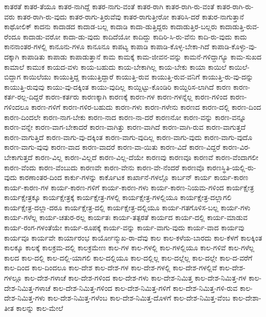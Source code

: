 {ಕಾತರತೆ
ಕಾತರ-ತೆಯೂ
ಕಾತರ-ನಾಗಿದ್ದೆ
ಕಾತರ-ನಾಗು-ವಂತೆ
ಕಾತರ-ರಾಗಿ
ಕಾತರ-ರಾಗಿ-ರು-ವಂತೆ
ಕಾತರ-ರಾಗಿ-ರು-ವರು
ಕಾತರ-ರಾಗಿ-ರು-ವುದು
ಕಾತರ-ರಾಗು-ತ್ತಿರುವೆವು
ಕಾತರ-ರಾಗುತ್ತೀರೋ
ಕಾತರಿಸಿ-ದರೆ
ಕಾತುರ-ನಾಗುತ್ತಾನೆ
ಕಾಥೋಲಿಕ್
ಕಾದನು
ಕಾದಾಡದ
ಕಾದಾಡ-ಬಲ್ಲ
ಕಾದಾಡಿ
ಕಾದಾ-ಡುತ್ತಿದ್ದರು
ಕಾದಾಡುತ್ತಿರ-ಬಲ್ಲರು
ಕಾದಾಡುತ್ತಿ-ರುವ-ರೆಂದೂ
ಕಾದಾಡು-ವರೋ
ಕಾದಾ-ಡು-ವುದು
ಕಾದಿದೆಯೋ
ಕಾದಿದ್ದು
ಕಾದಿರಿ-ಸಿ-ರು-ವೆನು
ಕಾದಿ-ರು-ವುದು
ಕಾದು
ಕಾನನಾಂತರ-ಗಳಲ್ಲಿ
ಕಾನೂನು-ಗಳೂ
ಕಾನೂನೂ
ಕಾಪಟ್ಯ
ಕಾಪಾಡಿ
ಕಾಪಾಡಿ-ಕೊಳ್ಳ-ಬೇಕಾ-ಗಿದೆ
ಕಾಪಾಡಿ-ಕೊಳ್ಳು-ವು-ದಕ್ಕಾಗಿ
ಕಾಪಾಡಿತು
ಕಾಪಾಡು
ಕಾಪಾಡುತ್ತಾನೆ
ಕಾಮ
ಕಾಮಕ್ಕೆ
ಕಾಮ-ಜೀವನ-ವನ್ನು
ಕಾಮನೆ-ಗಳಿದ್ದಾಗ್ಯೂ
ಕಾಮ-ಸುಖದ
ಕಾಮಾಲೆ
ಕಾಮುಕ
ಕಾಯದ-ವಳು
ಕಾಯ-ಬಹುದು
ಕಾಯ-ಬೇಕಾಗಿಲ್ಲ
ಕಾಯ-ಬೇಕು
ಕಾಯಾ
ಕಾಯಿಲೆ
ಕಾಯಿಲೆ-ಬಿದ್ದಾಗ
ಕಾಯಿಲೆಯು
ಕಾಯುತ್ತಿದ್ದ
ಕಾಯುತ್ತಿದ್ದಾರೆ
ಕಾಯುತ್ತಿ-ರುವ
ಕಾಯುತ್ತಿ-ರುವ-ವನಿಗೆ
ಕಾಯುತ್ತಿ-ರು-ವು-ದನ್ನು
ಕಾಯುತ್ತಿ-ರುವುವು
ಕಾಯು-ವು-ದಕ್ಕಿಂತ
ಕಾಯು-ವುದಿಲ್ಲ
ಕಾಯ್ದಿಟ್ಟು-ಕೊಂಡಿರಿ
ಕಾಯ್ದಿರಿಸ-ಲಾಗಿದೆ
ಕಾರಣ
ಕಾರಣ-ಕರ್ತ-ರಲ್ಲ-ದಿದ್ದರೆ
ಕಾರಣ-ಕರ್ತರು
ಕಾರಣಕ್ಕಾಗಿ
ಕಾರಣಕ್ಕೆ
ಕಾರಣ-ಗಳ
ಕಾರಣ-ಗಳನ್ನೆಲ್ಲ
ಕಾರಣ-ಗಳಿಂದ
ಕಾರಣ-ಗಳಿಂದಲೂ
ಕಾರಣ-ಗಳಿಗೆ
ಕಾರಣ-ಗಳಿರ-ಬಹುದು
ಕಾರಣ-ಗಳು
ಕಾರಣ-ಗಳೇನು
ಕಾರಣದ
ಕಾರಣ-ದಲ್ಲಿ
ಕಾರಣ-ದಿಂದ
ಕಾರಣ-ದಿಂದಲೇ
ಕಾರಣ-ನಾಗ-ಬೇಕು
ಕಾರಣ-ನಾದ
ಕಾರಣ-ನಾ-ದರೆ
ಕಾರಣನೋ
ಕಾರಣ-ವನ್ನು
ಕಾರಣ-ವನ್ನೂ
ಕಾರಣ-ವನ್ನೇ
ಕಾರಣ-ವಾಗ-ಬೇಕಾದರೆ
ಕಾರಣ-ವಾಗಿತ್ತು
ಕಾರಣ-ವಾಗಿದೆ
ಕಾರಣ-ವಾಗಿ-ರುವ
ಕಾರಣ-ವಾಗುತ್ತದೆ
ಕಾರಣ-ವಾಗುತ್ತಿದೆ
ಕಾರಣ-ವಾಗು-ವು-ದಕ್ಕಿಂತ
ಕಾರಣ-ವಾಗು-ವುದಿಲ್ಲ
ಕಾರಣ-ವಾಗು-ವುದು
ಕಾರಣ-ವಾಗು-ವುದೊ
ಕಾರಣ-ವಾಗು-ವುವು
ಕಾರಣ-ವಾದ
ಕಾರಣ-ವಾದರೆ
ಕಾರಣ-ವಾ-ಯಿತು
ಕಾರಣ-ವಿದೆ
ಕಾರಣ-ವಿದ್ದರೆ
ಕಾರಣ-ವಿರ-ಬೇಕಾಗುತ್ತದೆ
ಕಾರಣ-ವಿಲ್ಲ
ಕಾರಣ-ವಿಲ್ಲದೆ
ಕಾರಣ-ವಿಲ್ಲ-ದೆಯೇ
ಕಾರಣವು
ಕಾರಣವೂ
ಕಾರಣವೆ
ಕಾರಣ-ವೆಂದಾಗಲೀ
ಕಾರಣ-ವೆಂದು
ಕಾರಣ-ವೆಂಬುದು
ಕಾರಣವೇ
ಕಾರಣ-ವೇನು
ಕಾರಣ-ವೇ-ನೆಂದರೆ
ಕಾರಣವೊ
ಕಾರಣಸ್ಥಿತಿ-ಯಲ್ಲಿ-ರು-ವುದು
ಕಾರಣಾಂತರ-ದಿಂದ
ಕಾರ್ಕು-ಗಳನ್ನು
ಕಾರ್ಕೊಟಕ
ಕಾರ್ಖಾನೆ-ಗಳಲ್ಲೊ
ಕಾರ್ಬನ್
ಕಾರ್ಯ
ಕಾರ್ಯ-ಕಾರಣ
ಕಾರ್ಯ-ಕಾರಣ-ಗಳ
ಕಾರ್ಯ-ಕಾರಣ-ಗಳಿಗೆ
ಕಾರ್ಯ-ಕಾರಣ-ಗಳು
ಕಾರ್ಯ-ಕಾರಣ-ನಿಯಮ-ಗಳಿಂದ
ಕಾರ್ಯಕ್ಷೇತ್ರ
ಕಾರ್ಯಕ್ಷೇತ್ರಕ್ಕೂ
ಕಾರ್ಯಕ್ಷೇತ್ರಕ್ಕೆ
ಕಾರ್ಯಕ್ಷೇತ್ರ-ಗಳಲ್ಲಿ
ಕಾರ್ಯಕ್ಷೇತ್ರ-ಗಳಲ್ಲಿಯೂ
ಕಾರ್ಯಕ್ಷೇತ್ರ-ದಲ್ಲಾಗಲಿ
ಕಾರ್ಯಕ್ಷೇತ್ರ-ದಲ್ಲಾ-ದರೂ
ಕಾರ್ಯಕ್ಷೇತ್ರ-ದಲ್ಲಿ
ಕಾರ್ಯಕ್ಷೇತ್ರ-ದಲ್ಲಿಯೂ
ಕಾರ್ಯ-ಗತಗೊಳಿಸ-ಬಲ್ಲ
ಕಾರ್ಯ-ಗಳು
ಕಾರ್ಯ-ಗಳೆಲ್ಲ
ಕಾರ್ಯ-ಚತುರ-ರಲ್ಲ
ಕಾರ್ಯತಃ
ಕಾರ್ಯ-ತತ್ಪರತೆ
ಕಾರ್ಯದ
ಕಾರ್ಯ-ದಲ್ಲಿ
ಕಾರ್ಯ-ಮಾಡುವ
ಕಾರ್ಯ-ರಂಗ-ಗಳಂತೆಯೇ
ಕಾರ್ಯ-ರೂಪಕ್ಕೆ
ಕಾರ್ಯ-ವನ್ನು
ಕಾರ್ಯ-ವಾಗು-ವುದು
ಕಾರ್ಯ-ವಾದ
ಕಾರ್ಯವು
ಕಾರ್ಯವೂ
ಕಾರ್ಯವೇ
ಕಾರ್ಯಾರಂಭ
ಕಾರ್ಯೋನ್ಮುಖ-ರಾ-ದೆವು
ಕಾಲ
ಕಾಲ-ಕಳೆಯ-ಬಾರದು
ಕಾಲ-ಕೆಳಗೆ
ಕಾಲಕ್ಕಿಂತ
ಕಾಲಕ್ಕೂ
ಕಾಲಕ್ಕೆ
ಕಾಲಕ್ರಮ-ದಲ್ಲಿ
ಕಾಲಕ್ರಮೇಣ
ಕಾಲ-ಗಳ
ಕಾಲ-ಗಳಲ್ಲಿ
ಕಾಲ-ಗಳಲ್ಲಿಯೂ
ಕಾಲ-ಗಳಿವೆ
ಕಾಲ-ಗಳೆಲ್ಲ
ಕಾಲದ
ಕಾಲ-ದಲ್ಲಿ
ಕಾಲ-ದಲ್ಲಿ-ಯಾಗಲಿ
ಕಾಲ-ದಲ್ಲಿಯೂ
ಕಾಲ-ದಲ್ಲಿಲ್ಲ
ಕಾಲ-ದಲ್ಲೆಲ್ಲ
ಕಾಲ-ದಲ್ಲೇ
ಕಾಲ-ದ-ವರೆಗೆ
ಕಾಲ-ದಿಂದ
ಕಾಲ-ದಿಂದಲೂ
ಕಾಲ-ದೇಶ
ಕಾಲ-ದೇಶ-ಗಳ
ಕಾಲ-ದೇಶ-ಗಳಲ್ಲಿ
ಕಾಲ-ದೇಶ-ಗಳಲ್ಲಿವೆ
ಕಾಲ-ದೇಶ-ಗಳಲ್ಲೂ
ಕಾಲ-ದೇಶ-ಗಳಾಚೆ
ಕಾಲ-ದೇಶ-ಗಳಿಂದ
ಕಾಲ-ದೇಶ-ಗಳು
ಕಾಲ-ದೇಶ-ನಿಮಿತ್ತ
ಕಾಲ-ದೇಶ-ನಿಮಿತ್ತ-ಗಳ
ಕಾಲ-ದೇಶ-ನಿಮಿತ್ತ-ಗಳಾಚೆ
ಕಾಲ-ದೇಶ-ನಿಮಿತ್ತ-ಗಳಿಂದ
ಕಾಲ-ದೇಶ-ನಿಮಿತ್ತ-ಗಳಿಗೆ
ಕಾಲ-ದೇಶ-ನಿಮಿತ್ತ-ಗಳಿ-ರುವ
ಕಾಲ-ದೇಶ-ನಿಮಿತ್ತ-ಗಳು
ಕಾಲ-ದೇಶ-ನಿಮಿತ್ತ-ಗಳೆಂಬ
ಕಾಲ-ದೇಶ-ನಿಮಿತ್ತ-ದೊಳಗೆ
ಕಾಲ-ದೇಶ-ನಿಮಿತ್ತ-ವೆಂಬ
ಕಾಲ-ದೇಶಾ-ತೀತ
ಕಾಲನ್ನು
ಕಾಲ-ಮೇಲೆ
}
